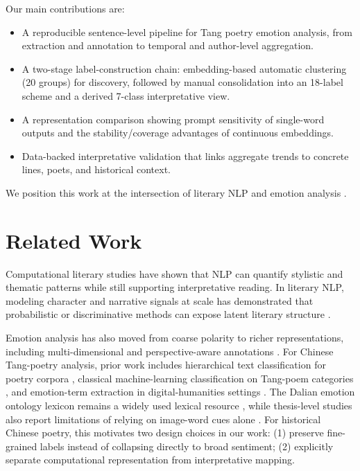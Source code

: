 \documentclass[11pt]{article}
\begin{document}
Our main contributions are:
\begin{itemize}
    \item A reproducible sentence-level pipeline for Tang poetry emotion analysis, from extraction and annotation to temporal and author-level aggregation.
    \item A two-stage label-construction chain: embedding-based automatic clustering (20 groups) for discovery, followed by manual consolidation into an 18-label scheme and a derived 7-class interpretative view.
    \item A representation comparison showing prompt sensitivity of single-word outputs and the stability/coverage advantages of continuous embeddings.
    \item Data-backed interpretative validation that links aggregate trends to concrete lines, poets, and historical context.
\end{itemize}

We position this work at the intersection of literary NLP and emotion analysis
\cite{bamman-etal-2014-bayesian,buechel-hahn-2017-emobank}.

\section{Related Work}

Computational literary studies have shown that NLP can quantify stylistic and thematic patterns while still supporting interpretative reading.
In literary NLP, modeling character and narrative signals at scale has demonstrated that probabilistic or discriminative methods can expose latent literary structure
\cite{bamman-etal-2014-bayesian}.

Emotion analysis has also moved from coarse polarity to richer representations, including multi-dimensional and perspective-aware annotations
\cite{buechel-hahn-2017-emobank}.
For Chinese Tang-poetry analysis, prior work includes hierarchical text classification for poetry corpora
\cite{xiao-2006-tang-classification},
classical machine-learning classification on Tang-poem categories
\cite{hu-zhu-2015-tang-topic},
and emotion-term extraction in digital-humanities settings
\cite{zhang-etal-2021-term-extraction}.
The Dalian emotion ontology lexicon remains a widely used lexical resource
\cite{dutir-2007-emotion-ontology},
while thesis-level studies also report limitations of relying on image-word cues alone
\cite{jiang-2020-yijing}.
For historical Chinese poetry, this motivates two design choices in our work:
(1) preserve fine-grained labels instead of collapsing directly to broad sentiment;
(2) explicitly separate computational representation from interpretative mapping.
\end{document}
